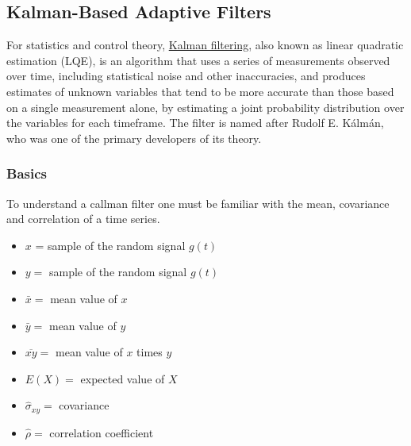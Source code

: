 \subsection{Kalman-Based Adaptive Filters}
For statistics and control theory, \href{https://en.wikipedia.org/wiki/Kalman_filter}{Kalman filtering}, also known as linear quadratic estimation (LQE), is an algorithm that uses a series of measurements observed over time, including statistical noise and other inaccuracies, and produces estimates of unknown variables that tend to be more accurate than those based on a single measurement alone, by estimating a joint probability distribution over the variables for each timeframe. The filter is named after Rudolf E. Kálmán, who was one of the primary developers of its theory. 
\subsubsection{Basics}
To understand a callman filter one must be familiar with the mean, covariance and correlation of a time series.
\begin{itemize}
  \item $x$ = sample of the random signal $g(t)$
  \item $y=$ sample of the random signal $g(t)$
  \item $\bar{x}=$ mean value of $x$
  \item $\bar{y}=$ mean value of $y$
  \item $\overline{x y}=$ mean value of $x$ times $y$
  \item $E(X)=$ expected value of $X$
  \item $\hat{\sigma}_{x y}=$ covariance
  \item $\hat{\rho}=$ correlation coefficient
\end{itemize}

